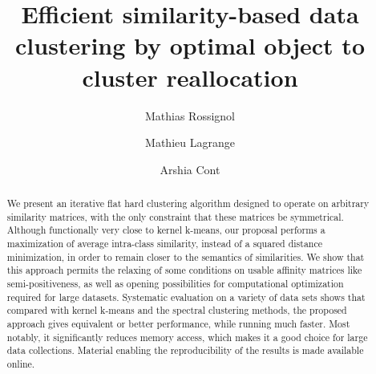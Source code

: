 \documentclass[natbib,smallextended]{svjour3}
\begin{document}
\title{Efficient similarity-based data clustering by optimal object to cluster reallocation}

\author{ Mathias Rossignol      \and
        Mathieu Lagrange  \and
        Arshia Cont
}
\authorrunning{} %


%
%




\maketitle


\begin{abstract}%
We present an iterative flat hard clustering algorithm designed to operate on arbitrary similarity matrices, with the only constraint that these matrices be symmetrical. Although functionally very close to kernel k-means, our proposal performs a maximization of average intra-class similarity, instead of a squared distance minimization, in order to remain closer to the semantics of similarities. We show that this approach permits the relaxing of some conditions on usable affinity matrices like semi-positiveness, as well as opening possibilities for computational optimization required for large datasets. Systematic evaluation on a variety of data sets shows that compared with kernel k-means and the spectral clustering methods, the proposed approach gives equivalent or better performance, while running much faster. Most notably, it significantly reduces memory access, which makes it a good choice for large data collections. Material enabling the reproducibility of the results is made available online.
\end{abstract}
\end{document}
